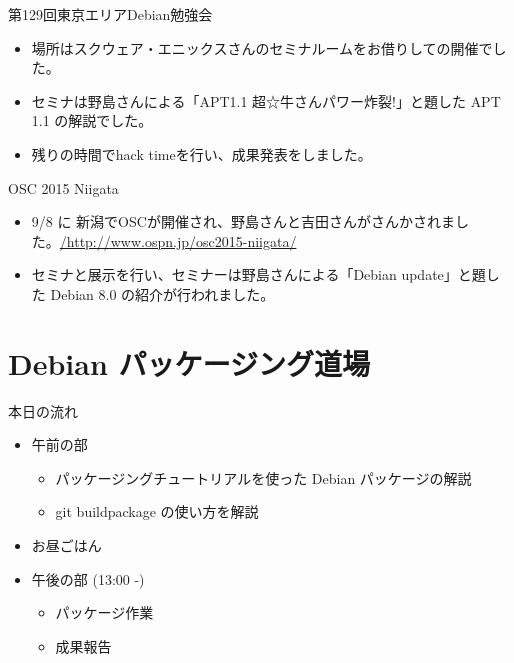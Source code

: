 \begin{frame}{第129回東京エリアDebian勉強会}

\begin{itemize}
\item 場所はスクウェア・エニックスさんのセミナルームをお借りしての開催でした。
\item セミナは野島さんによる「APT1.1 超☆牛さんパワー炸裂!」と題した APT 1.1 の解説でした。
\item 残りの時間でhack timeを行い、成果発表をしました。
\end{itemize} 
\end{frame}

\begin{frame}{OSC 2015 Niigata}

\begin{itemize}
\item 9/8 に 新潟でOSCが開催され、野島さんと吉田さんがさんかされました。\url{/http://www.ospn.jp/osc2015-niigata/}
\item セミナと展示を行い、セミナーは野島さんによる「Debian update」と題した Debian 8.0 の紹介が行われました。
\end{itemize} 

\end{frame}

\section{Debian パッケージング道場}

\begin{frame}{本日の流れ}

\begin{itemize}
 \item 午前の部
  \begin{itemize}
   \item パッケージングチュートリアルを使った Debian パッケージの解説
   \item git buildpackage の使い方を解説
  \end{itemize}
 \item お昼ごはん
 \item 午後の部 (13:00 -)
  \begin{itemize}
   \item パッケージ作業
   \item 成果報告
  \end{itemize}
\end{itemize}

\end{frame}

